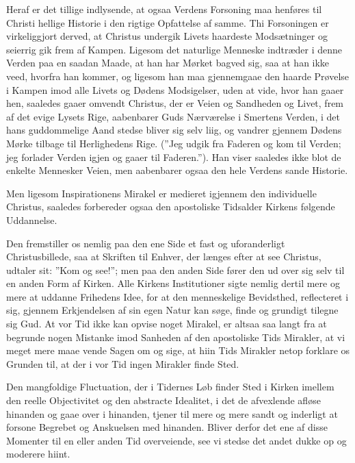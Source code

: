 \documentclass[12pt]{book}
\newcommand{\opage}[1]{\marginnote{\footnotesize\textit{[#1]}}}
\begin{document}
Heraf er det tillige indlysende, at ogsaa Verdens Forsoning maa henføres til
Christi hellige Historie i den rigtige Opfattelse af samme. Thi Forsoningen er
virkeliggjort derved, at Christus undergik Livets haardeste Modsætninger og
seierrig gik frem af Kampen. Ligesom det naturlige Menneske indtræder i denne
Verden paa en saadan Maade, at han har Mørket bagved sig, saa at han ikke veed,
hvorfra han kommer, og ligesom han maa gjennemgaae den haarde Prøvelse i Kampen
imod alle Livets og Dødens Modsigelser, uden at vide, hvor han gaaer hen,
saaledes gaaer omvendt Christus, der er Veien og Sandheden og Livet, frem af det
evige Lysets Rige, aabenbarer Guds Nærværelse i Smertens Verden, i det hans
guddommelige Aand stedse bliver sig selv liig, og vandrer gjennem Dødens Mørke
tilbage til Herlighedens Rige. (”Jeg udgik fra Faderen og kom til Verden; jeg
forlader Verden igjen og gaaer til Faderen.”). Han viser saaledes ikke blot de
enkelte Mennesker Veien, men aabenbarer ogsaa den hele Verdens sande Historie.

Men ligesom Inspirationens Mirakel er medieret igjennem den individuelle
Christus, saaledes forbereder ogsaa den apostoliske Tidsalder Kirkens følgende
Uddannelse.

Den fremstiller os nemlig paa den ene Side et fast og
\opage{156} uforanderligt Christusbillede, saa at Skriften til Enhver, der længes efter at
see Christus, udtaler sit: ”Kom og see!”; men paa den anden Side fører den ud
over sig selv til en anden Form af Kirken. Alle Kirkens Institutioner sigte
nemlig dertil mere og mere at uddanne Frihedens Idee, for at den menneskelige
Bevidsthed, reflecteret i sig, gjennem Erkjendelsen af sin egen Natur kan søge,
finde og grundigt tilegne sig Gud. At vor Tid ikke kan opvise noget Mirakel, er
altsaa saa langt fra at begrunde nogen Mistanke imod Sanheden af den apostoliske
Tids Mirakler, at vi meget mere maae vende Sagen om og sige, at hiin Tids
Mirakler netop forklare os Grunden til, at der i vor Tid ingen Mirakler finde
Sted.

Den mangfoldige Fluctuation, der i Tidernes Løb finder Sted i Kirken imellem den
reelle Objectivitet og den abstracte Idealitet, i det de afvexlende afløse
hinanden og gaae over i hinanden, tjener til mere og mere sandt og inderligt at
forsone Begrebet og Anskuelsen med hinanden. Bliver derfor det ene af disse
Momenter til en eller anden Tid overveiende, see vi stedse det andet dukke op og
moderere hiint.
\end{document}
